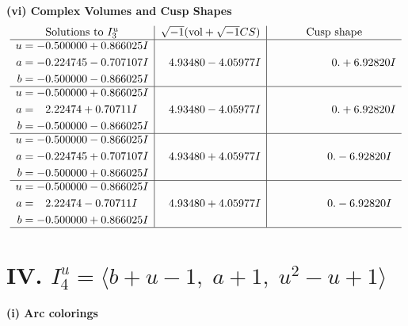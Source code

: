 \documentclass[1p]{elsarticle_modified}
\theoremstyle{definition}
\newcommand{\I}{\sqrt{-1}}
\begin{document}
\newpage\flushleft \textbf{(vi) Complex Volumes and Cusp Shapes}
$$\begin{array}{c|c|c}  
\text{Solutions to }I^u_{3}& \I (\text{vol} + \sqrt{-1}CS) & \text{Cusp shape}\\
 \hline 
\begin{aligned}
u &= -0.500000 + 0.866025 I \\
a &= -0.224745 - 0.707107 I \\
b &= -0.500000 - 0.866025 I\end{aligned}
 & \phantom{-}4.93480 - 4.05977 I & \phantom{-0.000000 -}0. + 6.92820 I \\ \hline\begin{aligned}
u &= -0.500000 + 0.866025 I \\
a &= \phantom{-}2.22474 + 0.70711 I \\
b &= -0.500000 - 0.866025 I\end{aligned}
 & \phantom{-}4.93480 - 4.05977 I & \phantom{-0.000000 -}0. + 6.92820 I \\ \hline\begin{aligned}
u &= -0.500000 - 0.866025 I \\
a &= -0.224745 + 0.707107 I \\
b &= -0.500000 + 0.866025 I\end{aligned}
 & \phantom{-}4.93480 + 4.05977 I & \phantom{-0.000000 } 0. - 6.92820 I \\ \hline\begin{aligned}
u &= -0.500000 - 0.866025 I \\
a &= \phantom{-}2.22474 - 0.70711 I \\
b &= -0.500000 + 0.866025 I\end{aligned}
 & \phantom{-}4.93480 + 4.05977 I & \phantom{-0.000000 } 0. - 6.92820 I\\
 \hline 
 \end{array}$$\newpage\newpage\renewcommand{\arraystretch}{1}
\centering \section*{IV. $I^u_{4}= \langle b+u-1,\;a+1,\;u^2- u+1 \rangle$}
\flushleft \textbf{(i) Arc colorings}\\
\end{document}
